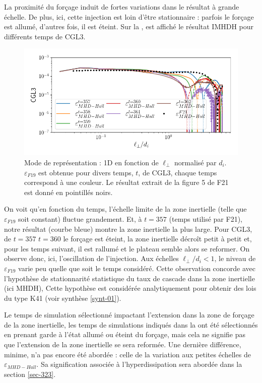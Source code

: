 La proximité du forçage induit de fortes variations dans le résultat à grande échelle. De plus, ici, cette injection est loin d'être stationnaire : parfois le forçage est allumé, d'autres fois, il est éteint. Sur la , est affiché le résultat \acs{IMHDH} pour différents temps de CGL3. 
\begin{figure}[!ht]
 \centering
\includegraphics[width=0.9\linewidth,trim=0cm 0cm 0cm 0cm, clip=true]{./Part_3/images_ch2/F19_time}
\cprotect\caption{Mode de représentation : \acs{1D} en fonction de $\ell_{\perp}$ normalisé par $d_i$. $\varepsilon_{F19}$ est obtenue pour divers temps, $t$, de CGL3, chaque temps correspond à une couleur. Le résultat extrait de la figure 5 de F21 est donné en pointillés noirs.   
}
\label{fig:compainc_t}
\end{figure} 
On voit qu'en fonction du temps, l'échelle limite de la zone inertielle (telle que  $\varepsilon_{F19}$ soit constant) fluctue grandement. Et, à $t=357$ (temps utilisé par F21), notre résultat (courbe bleue) montre la zone inertielle la plus large. Pour CGL3, de $t=357 $ $t=360 $ le forçage est éteint, la zone inertielle décroît petit à petit et, pour les temps suivant, il est rallumé et le plateau semble alors se reformer. On observe donc, ici, l'oscillation de l'injection. Aux échelles $\ell_{\perp}/d_i < 1$, le niveau de $\varepsilon_{F19}$ varie peu quelle que soit le temps considéré. Cette observation concorde avec l'hypothèse de stationnarité statistique du taux de cascade dans la zone inertielle (ici \acs{MHDH}), Cette hypothèse est considérée analytiquement pour obtenir des lois du type \acs{K41} (voir synthèse \ref{synt-01}). 


Le temps de simulation sélectionné impactant l'extension dans la zone de forçage de la zone inertielle, les temps de simulations indiqués dans la  ont été sélectionnés en prenant garde à l'état allumé ou éteint du forçage, mais cela ne signifie pas que l'extension de la zone inertielle se sera reformée. Une dernière différence, minime, n'a pas encore été abordée : celle de la variation aux petites échelles de $\varepsilon_{MHD-Hall}$. Sa signification associée à l'hyperdissipation sera abordée dans la section \ref{sec-323}.

